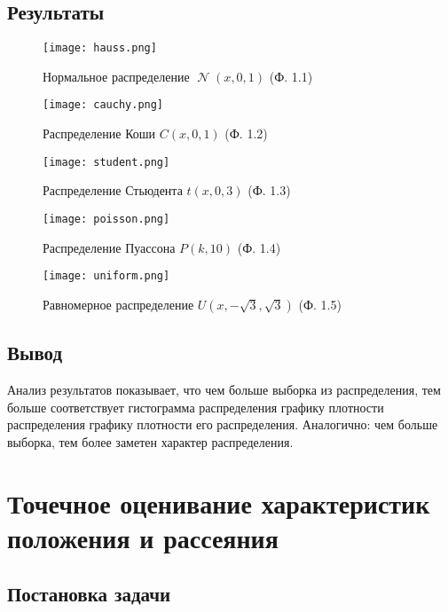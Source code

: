 \documentclass[14pt]{extarticle}
\DeclareMathOperator{\normal}{\mathcal{N}} %
\begin{document}
\subsection{Результаты}

\begin{figure}[H]
    \centering
    \texttt{[image: hauss.png]}
    \caption{Нормальное распределение \(\normal(x, 0, 1)\) (Ф. 1.1)}
    \label{fig:enter-label}
\end{figure}

\begin{figure}[H]
    \centering
    \texttt{[image: cauchy.png]}
    \caption{Распределение Коши \(C(x, 0, 1)\) (Ф. 1.2)}
    \label{fig:enter-label}
\end{figure}

\begin{figure}[H]
    \centering
    \texttt{[image: student.png]}
    \caption{Распределение Стьюдента \(t(x, 0, 3)\) (Ф. 1.3)}
    \label{fig:enter-label}
\end{figure}

\begin{figure}[H]
    \centering
    \texttt{[image: poisson.png]}
    \caption{Распределение Пуассона \(P(k, 10)\) (Ф. 1.4)}
    \label{fig:enter-label}
\end{figure}

\begin{figure}[H]
    \centering
    \texttt{[image: uniform.png]}
    \caption{Равномерное распределение \(U (x, -\sqrt{3}, \sqrt{3})\) (Ф. 1.5)}
    \label{fig:enter-label}
\end{figure}

\subsection{Вывод}

Анализ результатов показывает, что чем больше выборка из распределения, тем больше соответствует гистограмма распределения графику плотности распределения графику плотности его распределения. Аналогично: чем больше выборка, тем более заметен характер распределения.

\section{Точечное оценивание характеристик положения и рассеяния}

\subsection{Постановка задачи}
\end{document}
